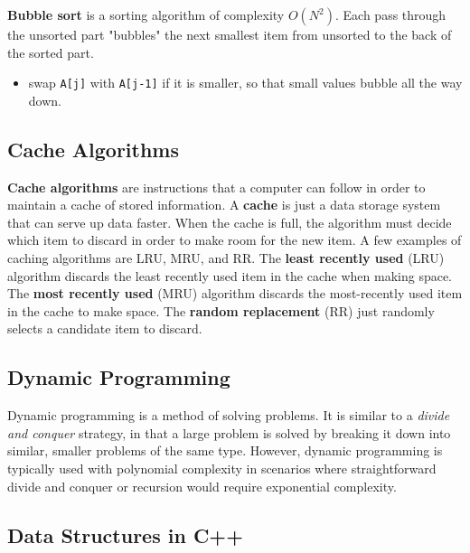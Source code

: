 \textbf{Bubble sort} is a sorting algorithm of complexity $O(N^{2})$. Each pass through the unsorted part "bubbles" the next smallest item from unsorted to the back of the sorted part. 

\begin{itemize}
	\item swap \texttt{A[j]} with \texttt{A[j-1]} if it is smaller, so that small values bubble all the way down. 
\end{itemize}

\subsection{Cache Algorithms}

\textbf{Cache algorithms} are instructions that a computer can follow in order to maintain a cache of stored information. A \textbf{cache} is just a data storage system that can serve up data faster. When the cache is full, the algorithm must decide which item to discard in order to make room for the new item. A few examples of caching algorithms are LRU, MRU, and RR. The \textbf{least recently used} (LRU) algorithm discards the least recently used item in the cache when making space. The \textbf{most recently used} (MRU) algorithm discards the most-recently used item in the cache to make space. The \textbf{random replacement} (RR) just randomly selects a candidate item to discard. 

\subsection{Dynamic Programming}

Dynamic programming is a method of solving problems. It is similar to a \textit{divide and conquer} strategy, in that a large problem is solved by breaking it down into similar, smaller problems of the same type. However, dynamic programming is typically used with polynomial complexity in scenarios where straightforward divide and conquer or recursion would require exponential complexity.

\subsection{Data Structures in C++}

